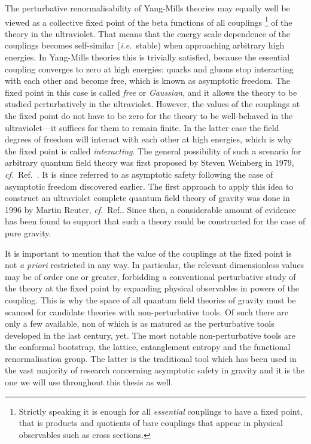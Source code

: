\documentclass[11pt]{book} %
\newcommand\apriori{\textit{a priori} }
\newcommand\ie{\textit{i.e.}\ }
\newcommand\cf{\textit{cf.}\ }
\numberwithin{equation}{chapter}
\begin{document}
The perturbative renormalisability of Yang-Mills theories may
equally well be viewed as
a collective fixed point of the beta functions of all couplings%
\footnote{%
  Strictly speaking it is enough for all \textit{essential} couplings
  to have a fixed point, that is products and quotients of bare couplings
  that appear in physical observables such as cross sections.
}
of the theory in the ultraviolet. That means that the energy scale dependence
of the couplings becomes self-similar (\ie stable) when approaching arbitrary
high energies. In Yang-Mills theories this is trivially satisfied, because
the essential coupling converges to zero at high energies: quarks and gluons stop interacting
with each other and become free, which is known as asymptotic freedom. The fixed
point in this case is called \textit{free} or \textit{Gaussian}, and it allows
the theory to be studied perturbatively in the ultraviolet. However, the values
of the couplings at the fixed point do not have to be zero for the theory to
be well-behaved in the ultraviolet---it suffices for them to remain finite.
In the latter case the field degrees of freedom will interact with each other at
high energies, which is why the fixed point is called \textit{interacting}.
The general possibility of such a scenario for arbitrary quantum field theory
was first proposed by Steven Weinberg in 1979, \cf Ref.~\cite{Weinberg:1980gg}.
It is since referred to as asymptotic safety following the case of asymptotic
freedom discovered earlier.
The first approach to apply this idea to construct an ultraviolet complete quantum
field theory of gravity was done in 1996 by Martin Reuter, \cf Ref.\cite{Reuter:1996cp}.
Since then, a considerable amount of evidence has been found to support that such
a theory could be constructed for the case of pure gravity.

It is important to mention that the value of the couplings at the fixed point is not
\apriori restricted in any way. In particular, the relevant dimensionless values
may be of order one or greater, forbidding a conventional perturbative study of the theory
at the fixed point by expanding physical observables in powers of the coupling.
This is why the space of all quantum field theories of gravity must be scanned for
candidate theories with non-perturbative tools. Of such there are only a few available,
non of which is as matured as the perturbative tools developed in the last century, yet.
The most notable non-perturbative tools are the conformal bootstrap,
the lattice, entanglement entropy and the functional renormalisation group.
The latter is the traditional tool which has been used in the vast majority
of research concerning asymptotic safety in gravity and it is the one we will use
throughout this thesis as well.
\end{document}
